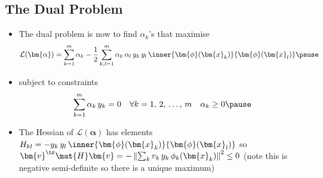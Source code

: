 \begin{slide}
\section{The Dual Problem}

\begin{PauseHighLight}
  \begin{itemize}
  \item The dual problem is now to find $\alpha_k$'s that maximise
    \begin{align*}
      \mathcal{L}(\bm{\alpha}) = \sum_{k=1}^m \alpha_k 
      - \frac{1}{2} \sum_{k,l=1}^m \alpha_k\,\alpha_l
      \,y_k\,y_l\, \inner{\bm{\phi}(\bm{x}_k)}{\bm{\phi}(\bm{x}_l)}\pause
    \end{align*}
  \item subject to constraints
    \begin{align*}
      \sum_{k=1}^m \alpha_k\, y_k
      &= 0
      & \forall k=1,\,2,\,\ldots,\, m \quad \alpha_k \geq 0\pause
    \end{align*}
  \item The Hessian of $\mathcal{L}(\bm{\alpha})$ has elements
    $H_{kl} = - y_k\,y_l\,
    \inner{\bm{\phi}(\bm{x}_k)}{\bm{\phi}(\bm{x}_l)}$ so
    $\bm{v}^\tr\mat{H}\bm{v} = -\left\|\sum_k
      v_k\,y_k\,\phi_k(\bm{x}_k)\right\|^2\leq0$\pause{} (note this is negative
    semi-definite so there is a unique maximum)\pauseb
  \end{itemize}
\end{PauseHighLight}

\end{slide}


